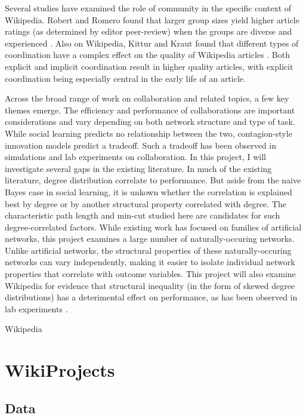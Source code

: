 \documentclass[10pt,twocolumn]{article}
\newcommand{\+}{\phantom{-}}
\begin{document}
Several studies have examined the role of community in the specific context
of Wikipedia.
Robert and Romero found that
larger group sizes yield higher article ratings
(as determined by editor peer-review)
when the groups are diverse and experienced
\cite{robert_when_2015}.
Also on Wikipedia,
Kittur and Kraut found that different types of coordination have a complex
effect on the quality of Wikipedia articles \cite{kittur_harnessing_2008}.
Both explicit and implicit coordination result in higher quality articles,
with explicit coordination being especially central in the early life of an
article.

Across the broad range of work on collaboration and related topics,
a few key themes emerge.
The efficiency and performance of collaborations are important considerations
and vary depending on both network structure and type of task.
While social learning predicts no relationship between the two,
contagion-style innovation models predict a tradeoff.
Such a tradeoff has been observed in simulations and lab experiments on
collaboration.
In this project, I will investigate several gaps in the existing literature.
In much of the existing literature,
degree distribution correlate to performance.
But aside from the naive Bayes case in social learning, it is unkown whether
the correlation is explained best by degree or by another structural property
correlated with degree.
The characteristic path length and min-cut studied here are candidates for such
degree-correlated factors.
While existing work has focused on families of artificial networks,
this project examines a large number of naturally-occuring networks.
Unlike artificial networks, the structural properties of these naturally-occuring
networks can vary independently, making it easier to isolate individual
network properties that correlate with outcome variables.
This project will also examine Wikipedia for evidence that structural
inequality (in the form of skewed
degree distributions) has a deterimental effect on performance,
as has been observed in lab experiments
\mbox{\cite{kearns_experiments_2012}}.

Wikipedia

\section{WikiProjects}

\subsection{Data}
\end{document}
